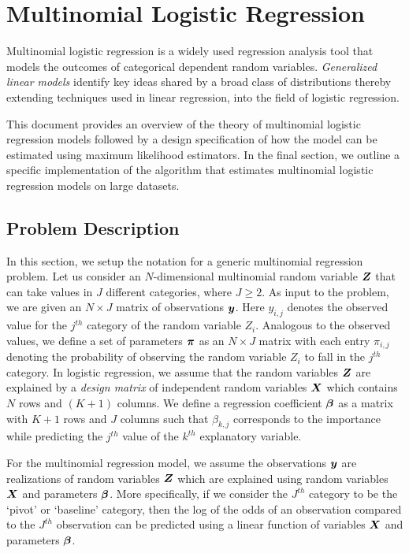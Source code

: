
\section{Multinomial Logistic Regression}\label{sec:multi_intro}

Multinomial logistic regression is a widely used regression analysis tool that
models the outcomes of categorical dependent random variables. {\it Generalized
linear models} identify key ideas shared by a broad class of distributions
thereby extending techniques used in linear regression, into the field of
logistic regression.

This document provides an overview of the theory of multinomial logistic
regression models followed by a design specification of how the model can be
estimated using maximum likelihood estimators. In the final section, we outline
a specific implementation of the algorithm that estimates multinomial logistic
regression models on large datasets.

\subsection{Problem Description}\label{sec:multi_problem}

In this section, we setup the notation for a generic multinomial regression
problem. Let us consider an $N$-dimensional multinomial random variable $\boldsymbol{Z}$
that can take values in $J$ different categories, where $J \geq 2$. As input to
the problem, we are given an $N\times J$ matrix of observations $\boldsymbol{y}$. Here
$y_{i,j}$ denotes the observed value for the $j^{th}$ category of the random
variable $Z_i$.  Analogous to the observed values, we define a set of parameters
$\boldsymbol{\pi}$  as an $N\times J$ matrix with each entry $\pi_{i,j}$ denoting the
probability of observing the random variable $Z_i$ to fall in the $j^{th}$
category. In logistic regression, we assume that the random variables $\boldsymbol{Z}$
are explained by a {\it design matrix} of independent random variables $\boldsymbol{X}$
which contains $N$ rows and $(K+1)$ columns. We define a regression coefficient
$\boldsymbol{\beta}$ as a matrix with $K+1$ rows and $J$ columns such that $\beta_{k,j}$
corresponds to the importance while predicting the $j^{th}$ value of the
$k^{th}$ explanatory variable.

For the multinomial regression model, we assume the observations $\boldsymbol{y}$ are
realizations of random variables $\boldsymbol{Z}$ which are explained using random
variables $\boldsymbol{X}$ and parameters $\boldsymbol{\beta}$. More specifically, if we
consider the $J^{th}$ category to be the `pivot' or `baseline' category, then
the log of the odds of an observation compared to the  $J^{th}$ observation can
be predicted using a linear function of variables $\boldsymbol{X}$ and parameters
$\boldsymbol{\beta}$.

